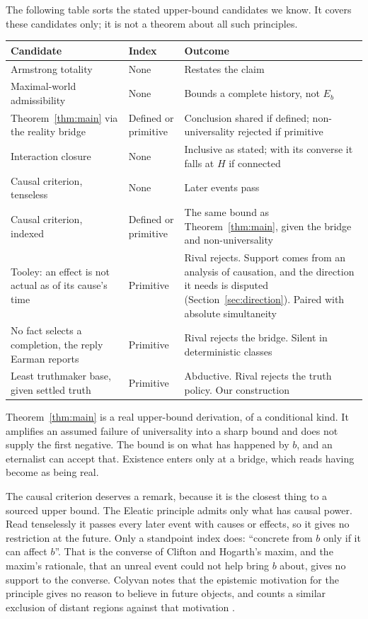 \documentclass[11pt]{article}
\theoremstyle{definition}
\begin{document}
The following table sorts the stated upper-bound candidates we know. It covers these candidates only; it is not a theorem about
all such principles.

\begin{center}
\begin{tabularx}{\textwidth}{@{}YlY@{}}
\toprule
Candidate & Index & Outcome\\
\midrule
Armstrong totality & None & Restates the claim\\
Maximal-world admissibility & None & Bounds a complete history, not $E_b$\\
Theorem~\ref{thm:main} via the reality bridge & Defined or primitive & Conclusion shared if defined; non-universality rejected if primitive\\
Interaction closure \citep{Brading2015} & None & Inclusive as stated; with its converse it falls at $H$ if connected\\
Causal criterion, tenseless \citep{Colyvan1998} & None & Later events pass\\
Causal criterion, indexed & Defined or primitive & The same bound as Theorem~\ref{thm:main}, given the bridge and non-universality\\
Tooley: an effect is not actual as of its cause's time & Primitive & Rival rejects. Support comes from an analysis of causation, and the direction it needs is disputed (Section~\ref{sec:direction}). Paired with absolute simultaneity\\
No fact selects a completion, the reply Earman reports \citep[pp.~144, 154, 159]{Earman2008} & Primitive & Rival rejects the bridge. Silent in deterministic classes\\
Least truthmaker base, given settled truth & Primitive & Abductive. Rival rejects the truth policy. Our construction\\
\bottomrule
\end{tabularx}
\end{center}

Theorem~\ref{thm:main} is a real upper-bound derivation, of a conditional kind. It amplifies an assumed failure of universality into a
sharp bound and does not supply the first negative. The bound is on what has happened by $b$, and an eternalist can accept that.
Existence enters only at a bridge, which reads having become as being real.

The causal criterion deserves a remark, because it is the closest thing to a sourced upper bound. The Eleatic principle admits only
what has causal power. Read tenselessly it passes every later event with causes or effects, so it gives no restriction at the future.
Only a standpoint index does: ``concrete from $b$ only if it can affect $b$''. That is the converse of Clifton and Hogarth's maxim,
and the maxim's rationale, that an unreal event could not help bring $b$ about, gives no support to the converse. Colyvan notes that the
epistemic motivation for the principle gives no reason to believe in future objects, and counts a similar exclusion of distant regions
against that motivation \citep{Colyvan1998}.
\end{document}

